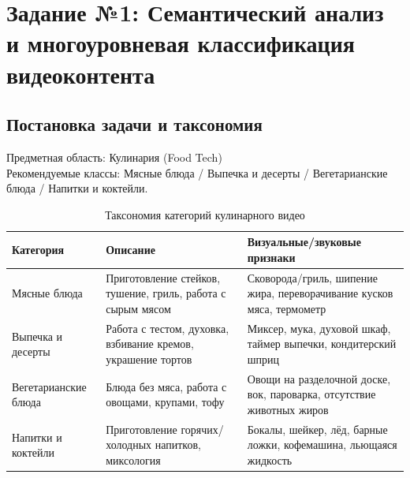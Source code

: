 \documentclass[oneside,a4paper,14pt]{extarticle} %
\begin{document}
		\newpage
		\section{Задание №1: Семантический анализ и многоуровневая классификация видеоконтента}
		\subsection{Постановка задачи и таксономия}
		\noindent
		Предметная область: Кулинария (Food Tech)\\
		Рекомендуемые классы: Мясные блюда / Выпечка и десерты / Вегетарианские блюда / Напитки и коктейли.
		\begin{table}[H]
			\centering
			\caption{Таксономия категорий кулинарного видео}
			\begin{tabularx}{\textwidth}{|p{3cm}|p{5cm}|p{5cm}|}
				\hline
				\textbf{Категория} & \textbf{Описание} & \textbf{Визуальные/звуковые признаки} \\ \hline
				Мясные блюда & Приготовление стейков, тушение, гриль, работа с сырым мясом & Сковорода/гриль, шипение жира, переворачивание кусков мяса, термометр \\ \hline
				Выпечка и десерты & Работа с тестом, духовка, взбивание кремов, украшение тортов & Миксер, мука, духовой шкаф, таймер выпечки, кондитерский шприц \\ \hline
				Вегетарианские блюда & Блюда без мяса, работа с овощами, крупами, тофу & Овощи на разделочной доске, вок, пароварка, отсутствие животных жиров \\ \hline
				Напитки и коктейли & Приготовление горячих/холодных напитков, миксология & Бокалы, шейкер, лёд, барные ложки, кофемашина, льющаяся жидкость \\ \hline
			\end{tabularx}
		\end{table}
		
\end{document}
